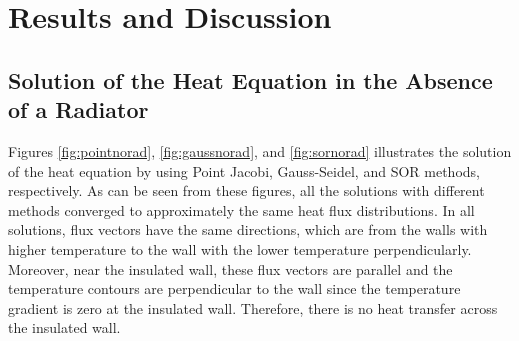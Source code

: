 \documentclass[letterpaper,12pt]{article}
\begin{document}
\newpage
\section{Results and Discussion}

\subsection{Solution of the Heat Equation in the Absence of a Radiator}
Figures \ref{fig:pointnorad}, \ref{fig:gaussnorad}, and \ref{fig:sornorad}
illustrates the solution of the heat equation by using Point Jacobi, Gauss-Seidel,
and SOR methods, respectively. As can be seen from these figures, all the solutions
with different methods converged to approximately the same heat flux distributions.
In all solutions, flux vectors have the same directions, which are from the walls
with higher temperature to the wall with the lower temperature perpendicularly.
Moreover, near the insulated wall, these flux vectors are parallel and the temperature
contours are perpendicular to the wall since the temperature gradient is zero at the
insulated wall. Therefore, there is no heat transfer across the insulated wall. 
\end{document}
